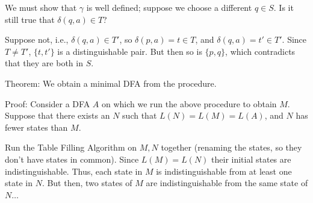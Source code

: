 \begin{frame}
We must show that $\gamma$ is well defined; suppose we choose a
different $q\in S$.  Is it still true that $\delta(q,a)\in T$?

Suppose not, i.e., $\delta(q,a)\in T'$, so $\delta(p,a)=t\in T$, and
$\delta(q,a)=t'\in T'$.  Since $T\neq T'$, $\{t,t'\}$ is a
distinguishable pair.  But then so is $\{p,q\}$, which contradicts
that they are both in $S$.

Theorem: We obtain a minimal DFA from the procedure.

Proof:  Consider a DFA $A$ on which we run the above procedure to
obtain $M$.  Suppose that there exists an $N$ such that
$L(N)=L(M)=L(A)$, and $N$ has fewer states than $M$.

Run the Table Filling Algorithm on $M,N$ together (renaming the
states, so they don't have states in common).  Since $L(M)=L(N)$ their
initial states are indistinguishable.  Thus, each state in $M$ is
indistinguishable from at least one state in $N$.  But then, two
states of $M$ are indistinguishable from the same state of $N\ldots$
\end{frame}


